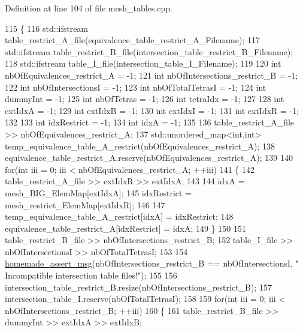 Definition at line 104 of file mesh\+\_\+tables.\+cpp.


\begin{DoxyCode}
115 \{
116     std::ifstream table\_restrict\_A\_file(equivalence\_table\_restrict\_A\_Filename);
117     std::ifstream table\_restrict\_B\_file(intersection\_table\_restrict\_B\_Filename);
118     std::ifstream table\_I\_file(intersection\_table\_I\_Filename);
119 
120     \textcolor{keywordtype}{int} nbOfEquivalences\_restrict\_A = -1;
121     \textcolor{keywordtype}{int} nbOfIntersections\_restrict\_B = -1;
122     \textcolor{keywordtype}{int} nbOfIntersectionsI  = -1;
123     \textcolor{keywordtype}{int} nbOfTotalTetrasI  = -1;
124     \textcolor{keywordtype}{int} dummyInt = -1;
125     \textcolor{keywordtype}{int} nbOfTetras = -1;
126     \textcolor{keywordtype}{int} tetraIdx = -1;
127 
128     \textcolor{keywordtype}{int} extIdxA = -1;
129     \textcolor{keywordtype}{int} extIdxB = -1;
130     \textcolor{keywordtype}{int} extIdxI = -1;
131     \textcolor{keywordtype}{int} extIdxR = -1;
132 
133     \textcolor{keywordtype}{int} idxRestrict = -1;
134     \textcolor{keywordtype}{int} idxA = -1;
135 
136     table\_restrict\_A\_file >> nbOfEquivalences\_restrict\_A;
137     std::unordered\_map<int,int> temp\_equivalence\_table\_A\_restrict(nbOfEquivalences\_restrict\_A);
138     equivalence\_table\_restrict\_A.reserve(nbOfEquivalences\_restrict\_A);
139 
140     \textcolor{keywordflow}{for}(\textcolor{keywordtype}{int} iii = 0; iii < nbOfEquivalences\_restrict\_A; ++iii)
141     \{
142         table\_restrict\_A\_file >> extIdxR >> extIdxA;
143 
144         idxA = mesh\_BIG\_ElemMap[extIdxA];
145         idxRestrict = mesh\_restrict\_ElemMap[extIdxR];
146 
147         temp\_equivalence\_table\_A\_restrict[idxA] = idxRestrict;
148         equivalence\_table\_restrict\_A[idxRestrict] = idxA;
149     \}
150 
151     table\_restrict\_B\_file >> nbOfIntersections\_restrict\_B;
152     table\_I\_file >> nbOfIntersectionsI >> nbOfTotalTetrasI;
153 
154     \hyperlink{common__header_8h_a593ccc80b790b2268653fcf6597bf451}{homemade\_assert\_msg}(nbOfIntersections\_restrict\_B == nbOfIntersectionsI, \textcolor{stringliteral}{"
      Incompatible intersection table files!"});
155 
156     intersection\_table\_restrict\_B.resize(nbOfIntersections\_restrict\_B);
157     intersection\_table\_I.reserve(nbOfTotalTetrasI);
158 
159     \textcolor{keywordflow}{for}(\textcolor{keywordtype}{int} iii = 0; iii < nbOfIntersections\_restrict\_B; ++iii)
160     \{
161         table\_restrict\_B\_file >> dummyInt >> extIdxA >> extIdxB;

\end{DoxyCode}
